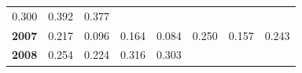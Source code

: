 \documentclass[]{article}
\begin{document}
\begin{longtable}[]{@{}rrrrrrrr@{}}
\begin{minipage}[t]{0.09\columnwidth}
0.300\strut
\end{minipage} & \begin{minipage}[t]{0.08\columnwidth}\raggedleft\strut
0.392\strut
\end{minipage} & \begin{minipage}[t]{0.10\columnwidth}\raggedleft\strut
0.377\strut
\end{minipage}\tabularnewline
\begin{minipage}[t]{0.08\columnwidth}\raggedleft\strut
\textbf{2007}\strut
\end{minipage} & \begin{minipage}[t]{0.10\columnwidth}\raggedleft\strut
0.217\strut
\end{minipage} & \begin{minipage}[t]{0.11\columnwidth}\raggedleft\strut
0.096\strut
\end{minipage} & \begin{minipage}[t]{0.08\columnwidth}\raggedleft\strut
0.164\strut
\end{minipage} & \begin{minipage}[t]{0.14\columnwidth}\raggedleft\strut
0.084\strut
\end{minipage} & \begin{minipage}[t]{0.09\columnwidth}\raggedleft\strut
0.250\strut
\end{minipage} & \begin{minipage}[t]{0.08\columnwidth}\raggedleft\strut
0.157\strut
\end{minipage} & \begin{minipage}[t]{0.10\columnwidth}\raggedleft\strut
0.243\strut
\end{minipage}\tabularnewline
\begin{minipage}[t]{0.08\columnwidth}\raggedleft\strut
\textbf{2008}\strut
\end{minipage} & \begin{minipage}[t]{0.10\columnwidth}\raggedleft\strut
0.254\strut
\end{minipage} & \begin{minipage}[t]{0.11\columnwidth}\raggedleft\strut
0.224\strut
\end{minipage} & \begin{minipage}[t]{0.08\columnwidth}\raggedleft\strut
0.316\strut
\end{minipage} & \begin{minipage}[t]{0.14\columnwidth}\raggedleft\strut
0.303\strut
\end{minipage} & \begin{minipage}[t]{0.09\columnwidth}\raggedleft\strut

\end{minipage}
\end{longtable}
\end{document}
